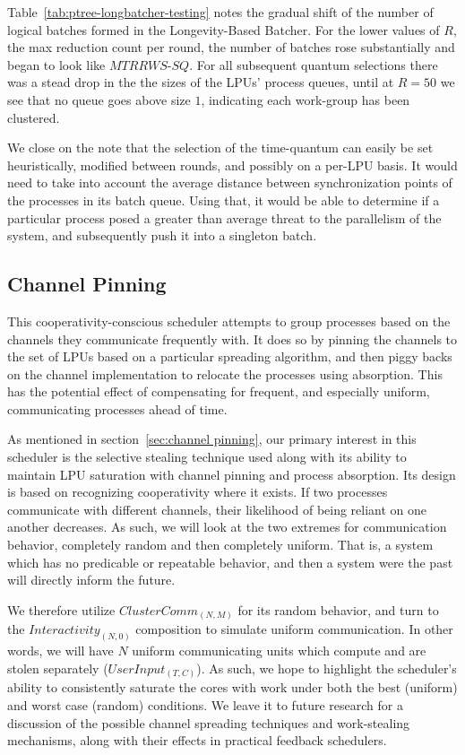 Table~\ref{tab:ptree-longbatcher-testing} notes the gradual shift of the number of 
logical batches formed in the Longevity-Based Batcher. For the lower values of 
$R$, the max reduction count per round, the number of batches rose substantially and
began to look like $MTRRWS$-$SQ$. For all subsequent quantum selections there was
a stead drop in the the sizes of the LPUs' process queues, until at $R=50$ we 
see that no queue goes above size $1$, indicating each work-group has been clustered.

We close on the note that the selection of the time-quantum can easily be set 
heuristically, modified between rounds, and possibly on a per-LPU basis. It would
need to take into account the average distance between synchronization points
of the processes in its batch queue. Using that, it would be able to determine if
a particular process posed a greater than average threat to the parallelism of the 
system, and subsequently push it into a singleton batch.

\subsection{Channel Pinning}\label{sec:results-channelpinner}

This cooperativity-conscious scheduler attempts to group processes based on the 
channels they communicate frequently with. It does so by pinning the channels to
the set of LPUs based on a particular spreading algorithm, and then piggy backs
on the channel implementation to relocate the processes using absorption. This 
has the potential effect of compensating for frequent, and especially uniform,
communicating processes ahead of time.

As mentioned in section~\ref{sec:channel pinning}, our primary interest in this 
scheduler is the selective stealing technique used along with its ability to 
maintain LPU saturation with channel pinning and process absorption. Its design 
is based on recognizing cooperativity where it exists. If two processes communicate
with different channels, their likelihood of being reliant on one another decreases.
As such, we will look at the two extremes for communication behavior, completely random 
and then completely uniform. That is, a system which has no predicable or
repeatable behavior, and then a system were the past will directly inform the future. 

We therefore utilize $ClusterComm_{(N,M)}$ for its random behavior, and turn to the 
$Interactivity_{(N,0)}$ composition to simulate uniform communication. In other words,
we will have $N$ uniform communicating units which compute and are stolen separately 
($UserInput_{(T,C)}$). As such, we hope to highlight the scheduler's ability to 
consistently saturate the cores with work under both the best (uniform) and worst
case (random) conditions. We leave it to future research for a discussion of the 
possible channel spreading techniques and work-stealing mechanisms, along with their
effects in practical feedback schedulers.


